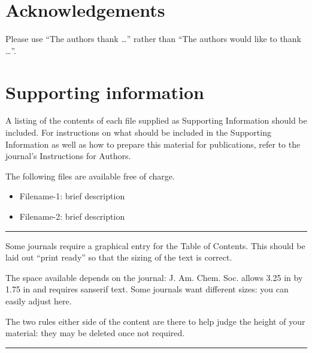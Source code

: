 \documentclass[letterpaper]{article}
\begin{document}
\section*{Acknowledgements}

Please use ``The authors thank \ldots'' rather than ``The authors would like to
thank \ldots''.

\section*{Supporting information}

A listing of the contents of each file supplied as Supporting Information
should be included. For instructions on what should be included in the
Supporting Information as well as how to prepare this material for
publications, refer to the journal's Instructions for Authors.

The following files are available free of charge.
\begin{itemize}
  \item Filename-1: brief description
  \item Filename-2: brief description
\end{itemize}

\printbibliography
%

\newpage

\rule{0.05in}{1.75in}%
\begin{minipage}[b][1.75in]{3.25in}
  \sffamily
  \frenchspacing

  Some journals require a graphical entry for the Table of Contents. This
  should be laid out ``print ready'' so that the sizing of the text is correct.

  The space available depends on the journal: J. Am. Chem. Soc. allows 3.25 in
  by 1.75 in and requires sanserif text. Some journals want different sizes:
  you can easily adjust here.
  
  The two rules either side of the content are there to help judge the height
  of your material: they may be deleted once not required.
  
\end{minipage}%
\rule{0.05in}{1.75in}
\end{document}
